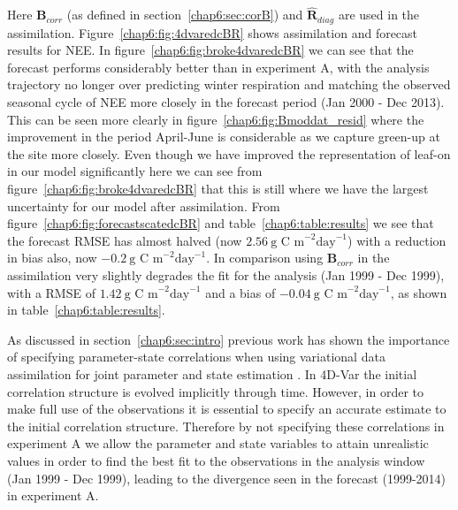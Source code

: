 Here $\textbf{B}_{corr}$ (as defined in section~\ref{chap6:sec:corB}) and $\hat{\textbf{R}}_{diag}$ are used in the assimilation. Figure~\ref{chap6:fig:4dvaredcBR} shows assimilation and forecast results for NEE. In figure~\ref{chap6:fig:broke4dvaredcBR} we can see that the forecast performs considerably better than in experiment A, with the analysis trajectory no longer over predicting winter respiration and matching the observed seasonal cycle of NEE more closely in the forecast period (Jan 2000 - Dec 2013). This can be seen more clearly in figure~\ref{chap6:fig:Bmoddat_resid} where the improvement in the period April-June is considerable as we capture green-up at the site more closely. Even though we have improved the representation of leaf-on in our model significantly here we can see from figure~\ref{chap6:fig:broke4dvaredcBR} that this is still where we have the largest uncertainty for our model after assimilation. From figure~\ref{chap6:fig:forecastscatedcBR} and table~\ref{chap6:table:results} we see that the forecast RMSE has almost halved (now $2.56 ~\text{g C m}^{-2}\text{day}^{-1}$) with a reduction in bias also, now $-0.2 ~\text{g C m}^{-2}\text{day}^{-1}$. In comparison using $\textbf{B}_{corr}$ in the assimilation very slightly degrades the fit for the analysis (Jan 1999 - Dec 1999), with a RMSE of $1.42 ~\text{g C m}^{-2}\text{day}^{-1}$ and a bias of $-0.04 ~\text{g C m}^{-2}\text{day}^{-1}$, as shown in table~\ref{chap6:table:results}. 

As discussed in section~\ref{chap6:sec:intro} previous work has shown the importance of specifying parameter-state correlations when using variational data assimilation for joint parameter and state estimation \citep{smith2009variational}. In 4D-Var the initial correlation structure is evolved implicitly through time. However, in order to make full use of the observations it is essential to specify an accurate estimate to the initial correlation structure. Therefore by not specifying these correlations in experiment A we allow the parameter and state variables to attain unrealistic values in order to find the best fit to the observations in the analysis window (Jan 1999 - Dec 1999), leading to the divergence seen in the forecast (1999-2014) in experiment A.
 
